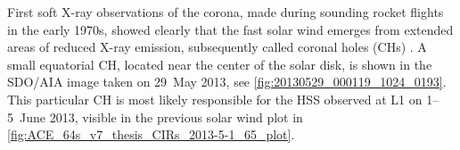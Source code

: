 First soft X-ray observations of the corona, made during sounding rocket flights in the early 1970s, showed clearly that the fast solar wind emerges from extended areas of reduced X-ray emission, subsequently called coronal holes (CHs) \citep{Krieger1973,Hundhausen1977}. A small equatorial CH, located near the center of the solar disk, is shown in the SDO/AIA image taken on 29~May 2013, see \autoref{fig:20130529_000119_1024_0193}. This particular CH is most likely responsible for the HSS observed at L1 on 1--5~June 2013, visible in the previous solar wind plot in \autoref{fig:ACE_64s_v7_thesis_CIRs_2013-5-1_65_plot}.
\begin{figure}[t]
	\begin{floatrow}
		\ffigbox{
}
\end{floatrow}
\end{figure}
